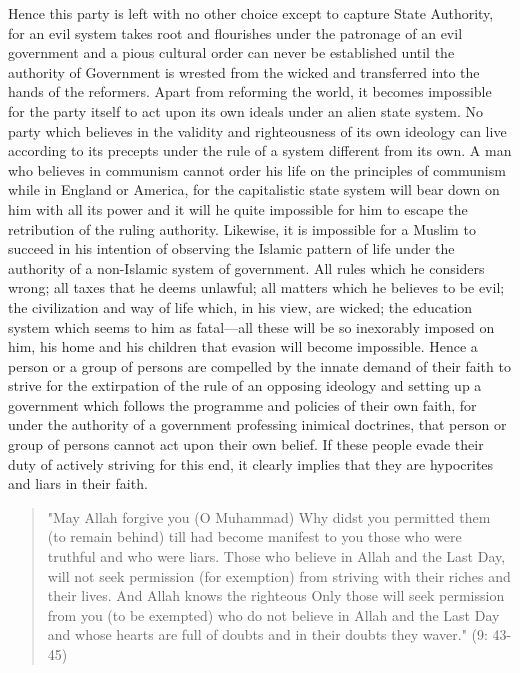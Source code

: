 Hence this party is left with no other choice except to capture State
Authority, for an evil system takes root and flourishes under the
patronage of an evil government and a pious cultural order can never be
established until the authority of Government is wrested from the wicked
and transferred into the hands of the reformers. Apart from reforming
the world, it becomes impossible for the party itself to act upon its
own ideals under an alien state system. No party which believes in the
validity and righteousness of its own ideology can live according to its
precepts under the rule of a system different from its own. A man who
believes in communism cannot order his life on the principles of
communism while in England or America, for the capitalistic state system
will bear down on him with all its power and it will he quite impossible
for him to escape the retribution of the ruling authority. Likewise, it
is impossible for a Muslim to succeed in his intention of observing the
Islamic pattern of life under the authority of a non-Islamic system of
government. All rules which he considers wrong; all taxes that he deems
unlawful; all matters which he believes to be evil; the civilization and
way of life which, in his view, are wicked; the education system which
seems to him as fatal---all these will be so inexorably imposed on
him, his home and his children that evasion will become impossible.
Hence a person or a group of persons are compelled by the innate demand
of their faith to strive for the extirpation of the rule of an opposing
ideology and setting up a government which follows the programme and
policies of their own faith, for under the authority of a government
professing inimical doctrines, that person or group of persons cannot
act upon their own belief. If these people evade their duty of actively
striving for this end, it clearly implies that they are hypocrites and
liars in their faith.

\begin{quote}
"May Allah forgive you (O Muhammad) Why didst you permitted them (to
remain behind) till had become manifest to you those who were truthful
and who were liars. Those who believe in Allah and the Last Day, will
not seek permission (for exemption) from striving with their riches and
their lives. And Allah knows the righteous Only those will seek
permission from you (to be exempted) who do not believe in Allah and the
Last Day and whose hearts are full of doubts and in their doubts they
waver." (9: 43-45)
\end{quote}

